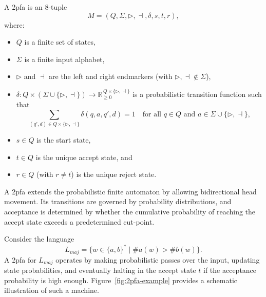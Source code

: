 
\subsubsection{}
\label{subsubsec:2pfa}

\begin{definition}
A \gls{2pfa} is an 8-tuple
\[
M = (Q, \Sigma, \triangleright, \dashv, \delta, s, t, r),
\]
where:
\begin{itemize}
    \item \(Q\) is a finite set of states,
    \item \(\Sigma\) is a finite input alphabet,
    \item \(\triangleright\) and \(\dashv\) are the left and right endmarkers (with \(\triangleright,\dashv \notin \Sigma\)),
    \item \(\delta: Q \times (\Sigma \cup \{\triangleright,\dashv\}) \to \mathbb{R}_{\ge 0}^{\,Q \times \{\triangleright,\dashv\}}\) is a probabilistic transition function such that
    \[
    \sum_{(q',d)\in Q\times\{\triangleright,\dashv\}} \delta(q,a,q',d) = 1 \quad \text{for all } q \in Q \text{ and } a \in \Sigma \cup \{\triangleright,\dashv\},
    \]
    \item \(s\in Q\) is the start state,
    \item \(t\in Q\) is the unique accept state, and
    \item \(r\in Q\) (with \(r\neq t\)) is the unique reject state.
\end{itemize}
\end{definition}

\begin{remark}
A \gls{2pfa} extends the probabilistic finite automaton by allowing bidirectional head movement. Its transitions are governed by probability distributions, and acceptance is determined by whether the cumulative probability of reaching the accept state exceeds a predetermined cut-point.
\end{remark}

\begin{example}
Consider the language 
\[
L_{maj} = \{ w \in \{a,b\}^* \mid \#a(w) > \#b(w) \}.
\]
A \gls{2pfa} for \(L_{maj}\) operates by making probabilistic passes over the input, updating state probabilities, and eventually halting in the accept state \(t\) if the acceptance probability is high enough. Figure~\ref{fig:2pfa-example} provides a schematic illustration of such a machine.
\end{example}

